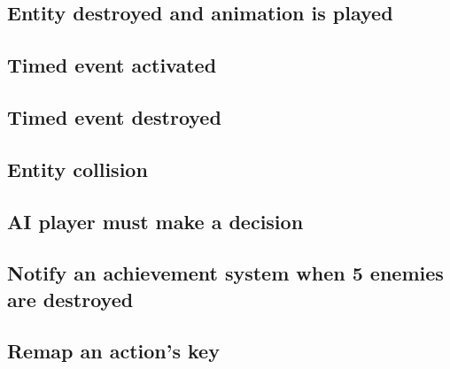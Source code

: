 \documentclass[12pt]{article}
\begin{document}
\subsection{Entity destroyed and animation is played}
\subsection{Timed event activated}
\subsection{Timed event destroyed}
\subsection{Entity collision}
\subsection{AI player must make a decision}
\subsection{Notify an achievement system when 5 enemies are destroyed}
\subsection{Remap an action's key}
\end{document}
